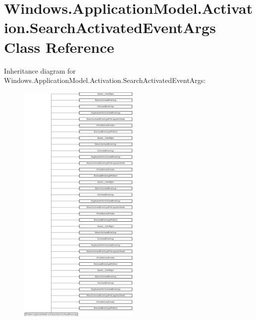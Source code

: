 \hypertarget{class_windows_1_1_application_model_1_1_activation_1_1_search_activated_event_args}{}\section{Windows.\+Application\+Model.\+Activation.\+Search\+Activated\+Event\+Args Class Reference}
\label{class_windows_1_1_application_model_1_1_activation_1_1_search_activated_event_args}
Inheritance diagram for Windows.\+Application\+Model.\+Activation.\+Search\+Activated\+Event\+Args\+:\begin{figure}[H]
\begin{center}
\leavevmode
\includegraphics[height=12.000000cm]{class_windows_1_1_application_model_1_1_activation_1_1_search_activated_event_args}
\end{center}
\end{figure}
